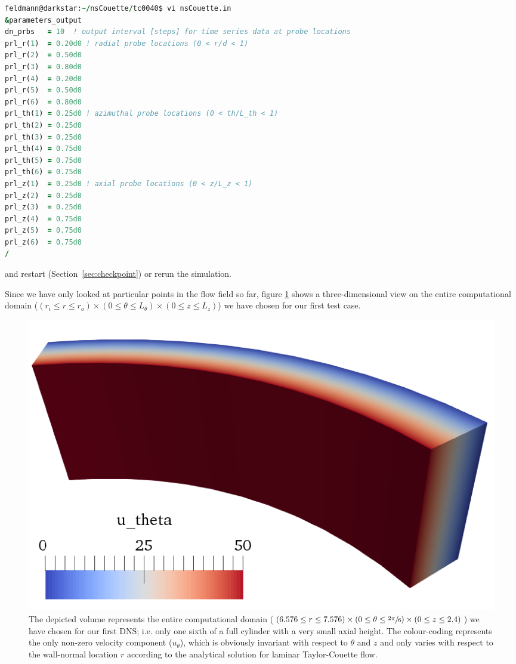 \documentclass[a4paper, 11pt, DIV=11]{scrartcl}
\begin{document}
\begin{lstlisting}[language=Fortran]
feldmann@darkstar:~/nsCouette/tc0040$ vi nsCouette.in
&parameters_output
dn_prbs   = 10  ! output interval [steps] for time series data at probe locations
prl_r(1)  = 0.20d0 ! radial probe locations (0 < r/d < 1)
prl_r(2)  = 0.50d0
prl_r(3)  = 0.80d0
prl_r(4)  = 0.20d0
prl_r(5)  = 0.50d0
prl_r(6)  = 0.80d0
prl_th(1) = 0.25d0 ! azimuthal probe locations (0 < th/L_th < 1)
prl_th(2) = 0.25d0
prl_th(3) = 0.25d0
prl_th(4) = 0.75d0
prl_th(5) = 0.75d0
prl_th(6) = 0.75d0
prl_z(1)  = 0.25d0 ! axial probe locations (0 < z/L_z < 1)
prl_z(2)  = 0.25d0
prl_z(3)  = 0.25d0
prl_z(4)  = 0.75d0
prl_z(5)  = 0.75d0
prl_z(6)  = 0.75d0
/
\end{lstlisting}
and restart (Section~\ref{sec:checkpoint}) or rerun the simulation.
\par
Since we have only looked at particular points in the flow field so far,
figure \ref{fig:tc0040laminarTaylorCouette} shows a three-dimensional
view on the entire computational domain ($(r_{i}\le r\le r_{o}) \times
(\num{0}\le\theta\le L_{\theta}) \times (\num{0}\le z\le L_{z})$) we have
chosen for our first test case.
\begin{figure}[htb]
\centering
\includegraphics[width=1.00\textwidth]{figures/tc0040/laminarTaylorCouette.png}
\caption{The depicted volume represents the entire computational domain
($(\num{6.576}\le r\le\num{7.576}) \times (\num{0}\le\theta\le\sfrac{2\pi}{6})
\times (\num{0}\le z\le\num{2.4})$) we have chosen for our first DNS; i.e. only
one sixth of a full cylinder with a very small axial height. The colour-coding
represents the only non-zero velocity component ($u_{\theta}$), which is
obviously invariant with respect to $\theta$ and $z$ and only varies with
respect to the wall-normal location $r$ according to the analytical solution
for laminar Taylor-Couette flow.}
\label{fig:tc0040laminarTaylorCouette}
\end{figure}
\end{document}
